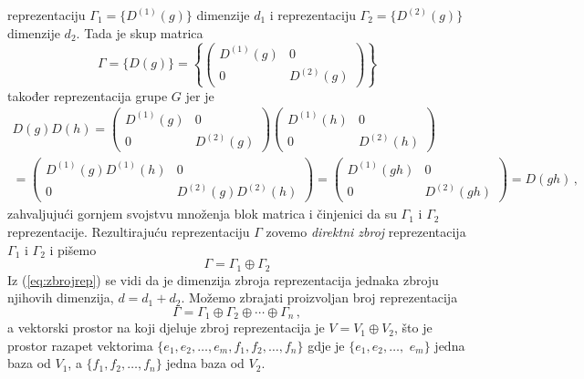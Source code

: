 reprezentaciju $\Gamma_{1}=\{D^{(1)}(g)\}$
dimenzije $d_1$ i reprezentaciju $\Gamma_{2}=\{D^{(2)}(g)\}$ dimenzije $d_2$.
Tada je skup matrica 
\begin{equation}
   \Gamma = \{D(g)\}= \left\{ 
   \begin{pmatrix}
     D^{(1)}(g) & 0 \\
       0  & D^{(2)}(g)
\end{pmatrix} \right\}
\label{eq:zbrojrep}
\end{equation}
također reprezentacija grupe $G$ jer je
\begin{multline*}
D(g)D(h)=
   \begin{pmatrix}
     D^{(1)}(g) & 0 \\
       0  & D^{(2)}(g)
\end{pmatrix}
   \begin{pmatrix}
     D^{(1)}(h) & 0 \\
       0  & D^{(2)}(h)
\end{pmatrix}  \\[2ex]
   =\! \begin{pmatrix}
     D^{(1)}(g)D^{(1)}(h) & 0 \\
       0  & D^{(2)}(g)D^{(2)}(h)
\end{pmatrix} 
\!=\!
   \begin{pmatrix}
     D^{(1)}(gh) & 0 \\
       0  & D^{(2)}(gh)
\end{pmatrix} 
=D(gh) \,,
\end{multline*}
zahvaljujući gornjem svojstvu množenja blok matrica i činjenici
da su $\Gamma_1$ i $\Gamma_2$ reprezentacije.
Rezultirajuću reprezentaciju $\Gamma$ zovemo \emph{direktni zbroj}
reprezentacija $\Gamma_1$ i $\Gamma_2$ i pišemo
\begin{displaymath}
\Gamma = \Gamma_1 \oplus \Gamma_2
\end{displaymath}
Iz (\ref{eq:zbrojrep}) se vidi da je
dimenzija zbroja reprezentacija jednaka zbroju njihovih dimenzija, $d=d_1 + d_2$.
Možemo zbrajati proizvoljan broj reprezentacija
\begin{displaymath}
\Gamma = \Gamma_1 \oplus \Gamma_2 \oplus \cdots \oplus \Gamma_n \,,
\end{displaymath}
a vektorski prostor na koji djeluje zbroj reprezentacija je
  $V=V_1 \oplus V_2$, što je prostor razapet vektorima
  $\{e_1, e_2, \ldots, e_m, f_1, f_2, \ldots, f_n\}$ gdje je
  $\{e_1, e_2, \ldots,$ $e_m\}$ jedna baza od $V_1$, a
  $\{f_1, f_2, \ldots, f_n\}$ jedna baza od $V_2$.


